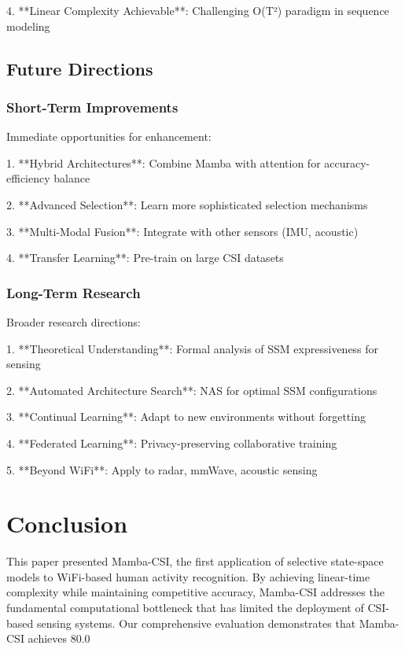 \documentclass[10pt,journal,compsoc]{IEEEtran}
\begin{document}
4. **Linear Complexity Achievable**: Challenging O(T²) paradigm in sequence modeling

\subsection{Future Directions}

\subsubsection{Short-Term Improvements}

Immediate opportunities for enhancement:

1. **Hybrid Architectures**: Combine Mamba with attention for accuracy-efficiency balance

2. **Advanced Selection**: Learn more sophisticated selection mechanisms

3. **Multi-Modal Fusion**: Integrate with other sensors (IMU, acoustic)

4. **Transfer Learning**: Pre-train on large CSI datasets

\subsubsection{Long-Term Research}

Broader research directions:

1. **Theoretical Understanding**: Formal analysis of SSM expressiveness for sensing

2. **Automated Architecture Search**: NAS for optimal SSM configurations

3. **Continual Learning**: Adapt to new environments without forgetting

4. **Federated Learning**: Privacy-preserving collaborative training

5. **Beyond WiFi**: Apply to radar, mmWave, acoustic sensing

\section{Conclusion}
\label{sec:conclusion}

This paper presented Mamba-CSI, the first application of selective state-space models to WiFi-based human activity recognition. By achieving linear-time complexity while maintaining competitive accuracy, Mamba-CSI addresses the fundamental computational bottleneck that has limited the deployment of CSI-based sensing systems. Our comprehensive evaluation demonstrates that Mamba-CSI achieves 80.0%
\end{document}
